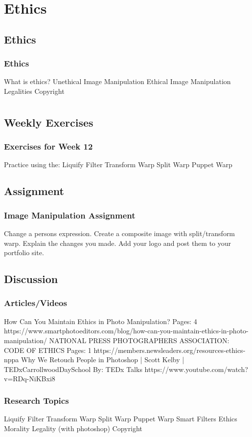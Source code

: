 \documentclass{beamer}
\begin{document}
	\section{Ethics}
			\subsection{Ethics}		
				\begin{frame}
					\frametitle{Ethics}
					\begin{outline}
						\1 What is ethics?
						\1 Unethical Image Manipulation
						\1 Ethical Image Manipulation
						\1 Legalities
						\1 Copyright
					\end{outline}
				\end{frame}


\section{}

\subsection{Weekly Exercises}		
\begin{frame}
	\frametitle{Exercises for Week 12}
	\begin{outline}
		\1 Practice using the:  
		\2 Liquify Filter
		\2 Transform Warp
		\2 Split Warp
		\2 Puppet Warp
	\end{outline}
\end{frame}

\subsection{Assignment}		
\begin{frame}
	\frametitle{Image Manipulation Assignment}
	\begin{outline}
		\1 Change a persons expression.
		\1 Create a composite image with split/transform warp.
		\2 Explain the changes you made.
		\2 Add your logo and post them to your portfolio site.
	\end{outline}
\end{frame}

\subsection{Discussion}		
\begin{frame}
	\frametitle{Articles/Videos}
	\begin{outline}
		\1 How Can You Maintain Ethics in Photo Manipulation?
		\2  Pages: 4
		\2 https://www.smartphotoeditors.com/blog/how-can-you-maintain-ethics-in-photo-manipulation/
		\1 NATIONAL PRESS PHOTOGRAPHERS ASSOCIATION: CODE OF ETHICS
		\2  Pages:  1
		\2 https://members.newsleaders.org/resources-ethics-nppa 
		\1 Why We Retouch People in Photoshop | Scott Kelby | TEDxCarrollwoodDaySchool
		\2 By:  TEDx Talks
		\2 https://www.youtube.com/watch?v=RDq-NiKBxi8
	\end{outline}
\end{frame}

\begin{frame}
	\frametitle{Research Topics}
	\begin{outline}
		\1 Liquify Filter
		\1 Transform Warp
		\1 Split Warp
		\1 Puppet Warp
		\1 Smart Filters
		\1 Ethics
		\1 Morality
		\1 Legality (with photoshop)
		\1 Copyright
	\end{outline}
\end{frame}
	
			
\end{document}

